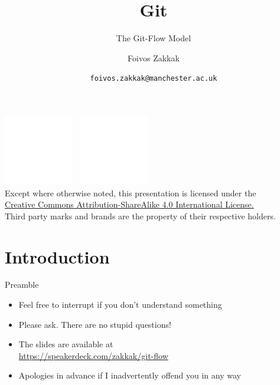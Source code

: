 \documentclass[
14pt,
aspectratio=169,
usenames,
dvipsnames,
x11names]{beamer}
\title[Git: The Git-Flow Model]{Git}
\subtitle{The Git-Flow Model}
\author[\texttt{foivos.zakkak@manchester.ac.uk}]{Foivos Zakkak}
\date{\texttt{foivos.zakkak@manchester.ac.uk}}
\begin{document}


\begin{frame}[plain]
  \titlepage
  \centering
  \includegraphics[height=.75cm]{../creative-commons/cc}~
  \includegraphics[height=.75cm]{../creative-commons/by}\\[1em]
  \scriptsize{Except where otherwise noted, this presentation is licensed under the\\
    \href{http://creativecommons.org/licenses/by/4.0/}%
    {Creative Commons Attribution-ShareAlike 4.0 International License.}\\[1ex]
    Third party marks and brands are the property of their respective
    holders.}
\end{frame}


\section{Introduction}

\begin{frame}{Preamble}
  \begin{itemize} \setlength{\itemsep}{\fill}
  \item Feel free to \alert{interrupt} if you don't understand something
  \item Please ask. \alert{There are no stupid questions}!
  \item The slides are available at\\ {\small\url{https://speakerdeck.com/zakkak/git-flow}}
  \item %
    Apologies in advance if I \alert{inadvertently} offend you in any way
  \end{itemize}
\end{frame}
\end{document}

